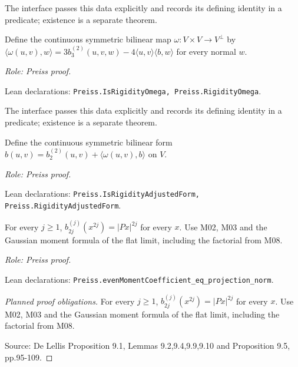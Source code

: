 \begin{definition}
\label{def:rigidity-omega}


The interface passes this data explicitly and records its defining identity in a predicate; existence is a separate theorem.




Define the continuous symmetric bilinear map $\omega:V\times V\to V^\perp$ by $\langle\omega(u,v),w\rangle=3b_3^{(2)}(u,v,w)-4\langle u,v\rangle\langle b,w\rangle$ for every normal $w$.
\par\emph{Role: Preiss proof.}
\par Lean declarations: \texttt{Preiss.IsRigidityOmega, Preiss.RigidityOmega}.
\end{definition}

\begin{definition}
\label{def:rigidity-adjusted-form}


The interface passes this data explicitly and records its defining identity in a predicate; existence is a separate theorem.




Define the continuous symmetric bilinear form $\widehat b(u,v)=b_2^{(2)}(u,v)+\langle\omega(u,v),b\rangle$ on $V$.
\par\emph{Role: Preiss proof.}
\par Lean declarations: \texttt{Preiss.IsRigidityAdjustedForm, Preiss.RigidityAdjustedForm}.
\end{definition}

\begin{lemma}
\label{lem:flat-infinity-moments}







For every $j\geq1$, $b_{2j}^{(j)}(x^{2j})=|Px|^{2j}$ for every $x$.
Use M02, M03 and the Gaussian moment formula of the flat limit, including the
factorial from M08.
\par\emph{Role: Preiss proof.}
\par Lean declarations: \texttt{Preiss.evenMomentCoefficient\_eq\_projection\_norm}.
\end{lemma}
\begin{proof}[Planned proof obligations]

For every $j\geq1$, $b_{2j}^{(j)}(x^{2j})=|Px|^{2j}$ for every $x$.
Use M02, M03 and the Gaussian moment formula of the flat limit, including the
factorial from M08.
\par Source: De Lellis Proposition 9.1, Lemmas 9.2,9.4,9.9,9.10 and Proposition 9.5, pp.95-109.
\end{proof}

